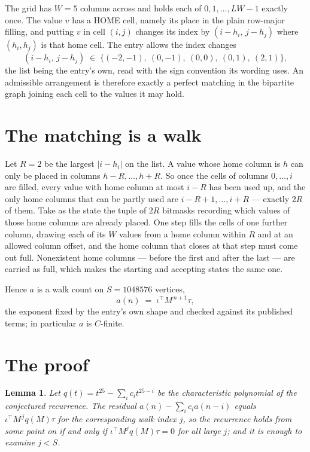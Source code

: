 \documentclass[11pt,a4paper]{article}
\theoremstyle{plain}
\newtheorem{lemma}[theorem]{Lemma}
\theoremstyle{definition}
\begin{document}
The grid has $W=5$ columns across and holds each of $0,1,\dots,LW-1$ exactly once. The value
$v$ has a HOME cell, namely its place in the plain row-major filling, and putting $v$ in cell
$(i,j)$ changes its index by $(i-h_i,\,j-h_j)$ where $(h_i,h_j)$ is that home cell. The entry
allows the index changes
\[
(i-h_i,\,j-h_j)\;\in\;\{(-2,-1),\ (0,-1),\ (0,0),\ (0,1),\ (2,1)\},
\]
the list being the entry's own, read with the sign convention its wording uses. An admissible
arrangement is therefore exactly a perfect matching in the bipartite graph joining each cell to
the values it may hold.

\section{The matching is a walk}

Let $R=2$ be the largest $|i-h_i|$ on the list. A value whose home column is $h$ can only be
placed in columns $h-R,\dots,h+R$. So once the cells of columns $0,\dots,i$ are filled, every
value with home column at most $i-R$ has been used up, and the only home columns that can be
partly used are $i-R+1,\dots,i+R$ --- exactly $2R$ of them. Take as the state the tuple of
$2R$ bitmasks recording which values of those home columns are already placed. One step fills
the cells of one further column, drawing each of its $W$ values from a home column within $R$
and at an allowed column offset, and the home column that closes at that step must come out
full. Nonexistent home columns --- before the first and after the last --- are carried as
full, which makes the starting and accepting states the same one.

Hence $a$ is a walk count on $S=1048576$ vertices,
\[
a(n)\;=\;\iota^{\!\top}M^{\,n+1}\tau ,
\]
the exponent fixed by the entry's own shape and checked against its published terms; in
particular $a$ is $C$-finite.

\section{The proof}

\begin{lemma}\label{lem:crit}
Let $q(t)=t^{25}-\sum_i c_it^{25-i}$ be the characteristic polynomial of the
conjectured recurrence. The residual $a(n)-\sum_ic_ia(n-i)$ equals
$\iota^{\!\top}M^{\,j}q(M)\tau$ for the corresponding walk index $j$, so the recurrence
holds from some point on if and only if $\iota^{\!\top}M^{j}q(M)\tau=0$ for all large $j$;
and it is enough to examine $j<S$.
\end{lemma}
\end{document}
